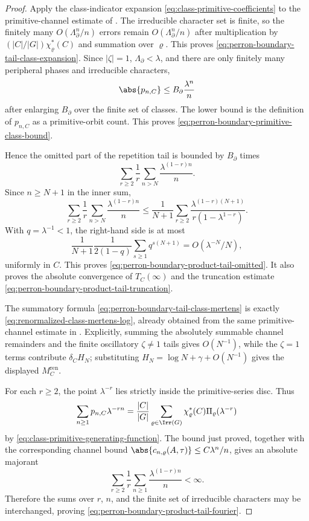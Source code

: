 \begin{proof}
  Apply the class-indicator expansion
  \eqref{eq:class-primitive-coefficients} to the primitive-channel estimate
  of .  The
  irreducible character set is finite, so the finitely many
  \(O(\Lambda_\partial^n/n)\) errors remain
  \(O(\Lambda_\partial^n/n)\) after multiplication by
  \((|C|/|G|)\chi_\varrho^\ast(C)\) and summation over \(\varrho\).  This
  proves \eqref{eq:perron-boundary-tail-class-expansion}.  Since
  \(|\zeta|=1\), \(\Lambda_\partial<\lambda\), and there are only finitely
  many peripheral phases and irreducible characters,
  \[
    \abs{p_{n,C}}\le B_{\partial}\frac{\lambda^n}{n}
  \]
  after enlarging \(B_{\partial}\) over the finite set of classes.  The lower
  bound is the definition of \(p_{n,C}\) as a primitive-orbit count.  This
  proves \eqref{eq:perron-boundary-primitive-class-bound}.

  Hence the omitted part of the repetition tail is bounded by
  \(B_{\partial}\) times
  \[
    \sum_{r\ge2}\frac1r\sum_{n>N}\frac{\lambda^{(1-r)n}}{n}.
  \]
  Since \(n\ge N+1\) in the inner sum,
  \[
    \sum_{r\ge2}\frac1r\sum_{n>N}\frac{\lambda^{(1-r)n}}{n}
    \le
    \frac1{N+1}
    \sum_{r\ge2}
      \frac{\lambda^{(1-r)(N+1)}}{r(1-\lambda^{1-r})}.
  \]
  With \(q=\lambda^{-1}<1\), the right-hand side is at most
  \[
    \frac1{N+1}
    \frac{1}{2(1-q)}
      \sum_{s\ge1}q^{s(N+1)}
    =
    O(\lambda^{-N}/N),
  \]
  uniformly in \(C\).  This proves
  \eqref{eq:perron-boundary-product-tail-omitted}.  It also proves the
  absolute convergence of \(T_C(\infty)\) and the truncation estimate
  \eqref{eq:perron-boundary-product-tail-truncation}.

  The summatory formula
  \eqref{eq:perron-boundary-tail-class-mertens} is exactly
  \eqref{eq:renormalized-class-mertens-log}, already obtained from the same
  primitive-channel estimate in
  .  Explicitly, summing the
  absolutely summable channel remainders and the finite oscillatory
  \(\zeta\ne1\) tails gives \(O(N^{-1})\), while the \(\zeta=1\) terms
  contribute \(\delta_C H_N\); substituting
  \(H_N=\log N+\gamma+O(N^{-1})\) gives the displayed
  \(M_C^{\mathrm{ren}}\).

  For each \(r\ge2\), the point \(\lambda^{-r}\) lies strictly inside the
  primitive-series disc.  Thus
  \[
    \sum_{n\ge1}p_{n,C}\lambda^{-rn}
    =
    \frac{|C|}{|G|}
      \sum_{\varrho\in\Irr(G)}
        \chi_\varrho^\ast(C)\Pi_\varrho(\lambda^{-r})
  \]
  by \eqref{eq:class-primitive-generating-function}.  The bound just proved,
  together with the corresponding channel bound
  \(\abs{c_{n,\varrho}(A,\tau)}\le C\lambda^n/n\), gives an absolute
  majorant
  \[
    \sum_{r\ge2}\frac1r\sum_{n\ge1}\frac{\lambda^{(1-r)n}}{n}<\infty .
  \]
  Therefore the sums over \(r\), \(n\), and the finite set of irreducible
  characters may be interchanged, proving
  \eqref{eq:perron-boundary-product-tail-fourier}.
\end{proof}

